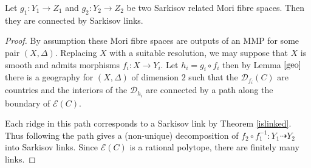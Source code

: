 \documentclass[a4paper,12pt]{amsart}
\begin{document}
	\begin{theorem}\label{sarkisov}
		Let $g_{1}:Y_{1} \to Z_{1}$ and $g_{2}:Y_{2} \to Z_{2}$ be two Sarkisov related Mori fibre spaces. Then they are connected by Sarkisov links.
	\end{theorem}

	\begin{proof}
		
		By assumption these Mori fibre spaces are outputs of an MMP for some pair $(X,\Delta)$. Replacing $X$ with a suitable resolution, we may suppose that $X$ is smooth and admits morphisms $f_{i}:X \to Y_{i}$. Let $h_{i}=g_{i} \circ f_{i}$ then by Lemma $\ref{geo}$ there is a geography for $(X,\Delta)$ of dimension $2$ such that the $\mathcal{D}_{f_{i}}(C)$ are countries and the interiors of the $\mathcal{D}_{h_{i}}$ are connected by a path along the boundary of $\mathcal{E}(C)$. 
		
		Each ridge in this path corresponds to a Sarkisov link by Theorem \ref{islinked}. Thus following the path gives a (non-unique) decomposition of $f_{2} \circ f_{1}^{-1} \colon Y_{1} \dashrightarrow Y_{2}$ into Sarkisov links. Since $\mathcal{E}(C)$ is a rational polytope, there are finitely many links.
		
		
	\end{proof}
	
	
	
\end{document}
